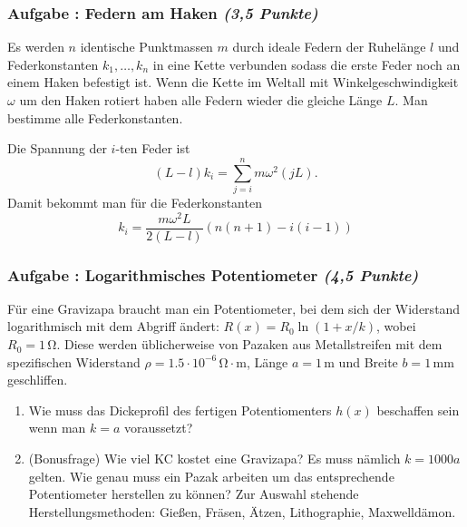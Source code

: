 \documentclass[12pt,a4paper]{article}
\newcommand{\ee}[1]{\cdot 10^{#1}}
\newcommand{\unit}[1]{\,\mathrm{#1}}
\newenvironment{abcenum}{\renewcommand{\labelenumi}{(\alph{enumi})} \begin{enumerate}}{\end{enumerate}\renewcommand{\labelenumi}{\theenumi .}}
\newcounter{numlabel}
\newenvironment{problem}[2]{\stepcounter{numlabel} \vspace{1ex} \subsubsection*{Aufgabe \the\value{numlabel}: #1 \emph{(#2 Punkte)}} \renewcommand{\Currentlabel}{Aufgabe \the\value{numlabel}: #1}}{

}
\begin{document}

\begin{problem}{Federn am Haken}{3,5}
Es werden $n$ identische Punktmassen $m$ durch ideale Federn der Ruhelänge $l$ und Federkonstanten $k_1,\dots, k_n$ in eine Kette verbunden sodass die erste Feder noch an einem Haken befestigt ist. Wenn die Kette im Weltall mit Winkelgeschwindigkeit $\omega$ um den Haken rotiert haben alle Federn wieder die gleiche Länge $L$. Man bestimme alle Federkonstanten.
\begin{solution}
Die Spannung der $i$-ten Feder ist
\[
(L-l) k_i = \sum_{j=i}^n m \omega^2 (jL).
\]
Damit bekommt man für die Federkonstanten
\[
k_i = \frac{m \omega^2 L}{2 (L-l)} \left( n(n+1) - i(i-1) \right)
\]
\end{solution}
\end{problem}

\begin{problem}{Logarithmisches Potentiometer}{4,5}
Für eine Gravizapa braucht man ein Potentiometer, bei dem sich der Widerstand logarithmisch mit dem Abgriff ändert: $R(x) = R_0 \ln(1+x/k)$, wobei $R_0 = 1 \unit{\Omega}$. Diese werden üblicherweise von Pazaken aus Metallstreifen mit dem spezifischen Widerstand $\rho = 1.5\ee{-6} \unit{\Omega\cdot m}$, Länge $a = 1\unit{m}$ und Breite $b = 1\unit{mm}$ geschliffen.
\begin{abcenum}
\item Wie muss das Dickeprofil des fertigen Potentiomenters $h(x)$ beschaffen sein wenn man $k=a$ voraussetzt?
\item (Bonusfrage) Wie viel KC kostet eine Gravizapa? Es muss nämlich $k=1000 a$ gelten. Wie genau muss ein Pazak arbeiten um das entsprechende Potentiometer herstellen zu können? Zur Auswahl stehende Herstellungsmethoden: Gießen, Fräsen, Ätzen, Lithographie, Maxwelldämon.
\end{abcenum}
\end{problem}
\end{document}

